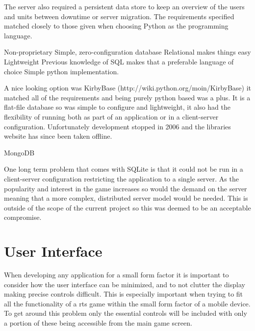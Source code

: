 The server also required a persistent data store to keep an overview of the users and units between downtime or server migration. The requirements specified matched closely to those given when choosing Python as the programming language. 


    Non-proprietary
    Simple, zero-configuration database
    Relational makes things easy
    Lightweight
    Previous knowledge of SQL makes that a preferable language of choice
    Simple python implementation.

A nice looking option was KirbyBase (http://wiki.python.org/moin/KirbyBase) it matched all of the requirements and being purely python based was a plus. It is a flat-file database so was simple to configure and lightweight, it also had the flexibility of running both as part of an application or in a client-server configuration. Unfortunately development stopped in 2006 and the libraries website has since been taken offline.

MongoDB  

One long term problem that comes with SQLite is that it could not be run in a client-server configuration restricting the application to a single server. As the popularity and interest in the game increases so would the demand on the server meaning that a more complex, distributed server model would be needed. This is outside of the scope of the current project so this was deemed to be an acceptable compromise.

\section{User Interface}
When developing any application for a small form factor it is important to consider how the user interface can be minimized, and to not clutter the display making precise controls difficult. This is especially important when trying to fit all the functionality of a \gls{rts} game within the small form factor of a mobile device. To get around this problem only the essential controls will be included with only a portion of these being accessible from the main game screen.

